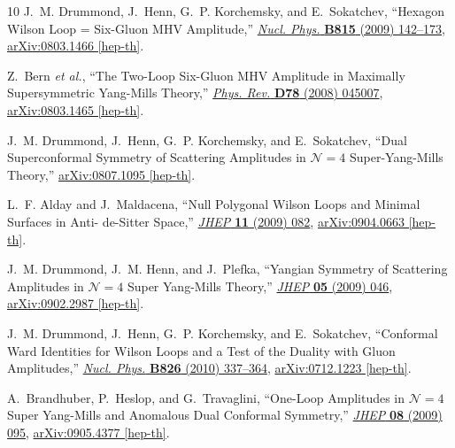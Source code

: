 \documentclass[11pt, reqno]{article}
\begin{document}
\begin{thebibliography}{10}
J.~M. Drummond, J.~Henn, G.~P. Korchemsky, and E.~Sokatchev, ``{Hexagon Wilson
  Loop = Six-Gluon MHV Amplitude},''
  \href{http://dx.doi.org/10.1016/j.nuclphysb.2009.02.015}{{\em Nucl. Phys.}
  {\bf B815} (2009)  142--173},
\href{http://arxiv.org/abs/0803.1466}{{ arXiv:0803.1466 [hep-th]}}.

Z.~Bern {\em et al.}, ``{The Two-Loop Six-Gluon MHV Amplitude in Maximally
  Supersymmetric Yang-Mills Theory},''
  \href{http://dx.doi.org/10.1103/PhysRevD.78.045007}{{\em Phys. Rev.} {\bf
  D78} (2008)  045007},
\href{http://arxiv.org/abs/0803.1465}{{ arXiv:0803.1465 [hep-th]}}.

J.~M. Drummond, J.~Henn, G.~P. Korchemsky, and E.~Sokatchev, ``{Dual
  Superconformal Symmetry of Scattering Amplitudes in $\mathcal{N}=4$
  Super-Yang-Mills Theory},''
\href{http://arxiv.org/abs/0807.1095}{{ arXiv:0807.1095 [hep-th]}}.

L.~F. Alday and J.~Maldacena, ``{Null Polygonal Wilson Loops and Minimal
  Surfaces in Anti- de-Sitter Space},''
  \href{http://dx.doi.org/10.1088/1126-6708/2009/11/082}{{\em JHEP} {\bf 11}
  (2009)  082},
\href{http://arxiv.org/abs/0904.0663}{{ arXiv:0904.0663 [hep-th]}}.

J.~M. Drummond, J.~M. Henn, and J.~Plefka, ``{Yangian Symmetry of Scattering
  Amplitudes in $\mathcal{N}=4$ Super Yang-Mills Theory},''
  \href{http://dx.doi.org/10.1088/1126-6708/2009/05/046}{{\em JHEP} {\bf 05}
  (2009)  046},
\href{http://arxiv.org/abs/0902.2987}{{ arXiv:0902.2987 [hep-th]}}.

J.~M. Drummond, J.~Henn, G.~P. Korchemsky, and E.~Sokatchev, ``{Conformal Ward
  Identities for Wilson Loops and a Test of the Duality with Gluon
  Amplitudes},'' \href{http://dx.doi.org/10.1016/j.nuclphysb.2009.10.013}{{\em
  Nucl. Phys.} {\bf B826} (2010)  337--364},
\href{http://arxiv.org/abs/0712.1223}{{ arXiv:0712.1223 [hep-th]}}.

A.~Brandhuber, P.~Heslop, and G.~Travaglini, ``{One-Loop Amplitudes in
  $\mathcal{N}=4$ Super Yang-Mills and Anomalous Dual Conformal Symmetry},''
  \href{http://dx.doi.org/10.1088/1126-6708/2009/08/095}{{\em JHEP} {\bf 08}
  (2009)  095},
\href{http://arxiv.org/abs/0905.4377}{{ arXiv:0905.4377 [hep-th]}}.


\end{thebibliography}
\end{document}
